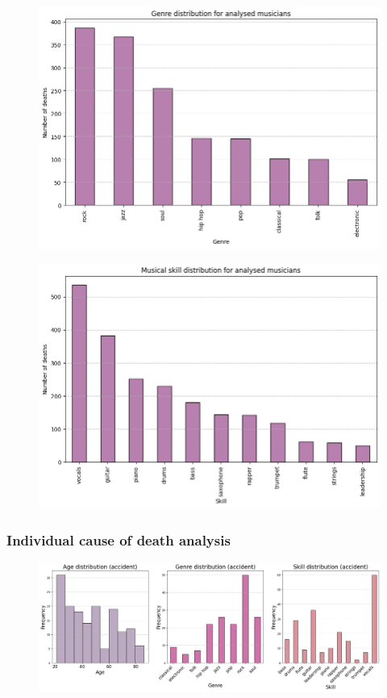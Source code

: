 \documentclass{article}
\begin{document}
\begin{figure}[H]
    \centering
    \includegraphics[width=0.8\linewidth]{graph_images/exploratory_analysis/genre.png}
    \label{fig:enter-label}
\end{figure}

\begin{figure}[H]
    \centering
    \includegraphics[width=0.8\linewidth]{graph_images/exploratory_analysis/skill.png}
    \label{fig:enter-label}
\end{figure}



\subsubsection{Individual cause of death analysis}

\begin{figure}[H]
    \centering
    \includegraphics[width=1\linewidth]{graph_images/death_cause_analysis/accident_distribution.png}
    \label{fig:enter-label}
\end{figure}
\end{document}
